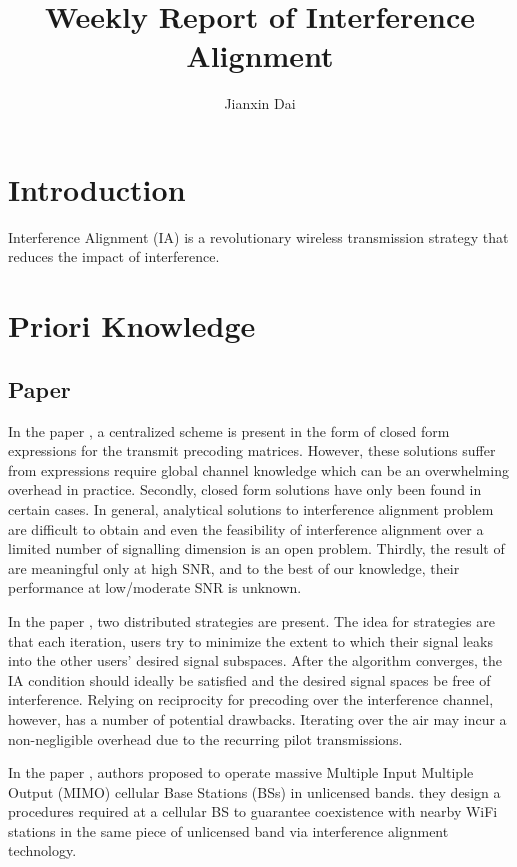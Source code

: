 \documentclass[12pt, onecolumn]{IEEEtran}
\author{Jianxin Dai\\
}
\title{Weekly Report of Interference Alignment }
\begin{document}
\maketitle

\section{Introduction}
Interference Alignment (IA) is a revolutionary wireless transmission strategy that reduces the impact of interference.

\section{Priori Knowledge}
\subsection{Paper}
In the paper \cite{cadambe2008interference}, a centralized scheme is present in the form of closed form expressions for the transmit precoding matrices. However, these solutions suffer from expressions require global channel knowledge which can be an  overwhelming overhead in practice. Secondly, closed form solutions have only been found in certain cases. In general, analytical solutions to interference alignment problem are difficult to obtain and even the feasibility of interference alignment over  a limited number of signalling dimension is an open problem. Thirdly, the result of \cite{cadambe2008interference} are meaningful only at high SNR, and to the best of  our knowledge, their performance  at low/moderate SNR is unknown.


In the paper \cite{gomadam2011distributed}, two  distributed strategies are present. The idea for strategies are  that each iteration, users try to minimize the extent to which their signal leaks into the other users' desired signal subspaces. After the algorithm converges, the IA condition should ideally be satisfied and the desired signal spaces be free of interference.   Relying on reciprocity for precoding over the interference channel, however, has a number of potential drawbacks. Iterating over the air may incur a non-negligible overhead due to the recurring pilot transmissions.

\textcolor[rgb]{1.00,0.00,0.00}{In the paper \cite{geraci2017operating}, authors proposed to operate massive Multiple Input Multiple Output (MIMO) cellular Base Stations (BSs) in unlicensed bands. they design a procedures required at a cellular BS to guarantee coexistence with nearby WiFi stations in the same piece of unlicensed band via interference alignment technology.  }
\end{document}
